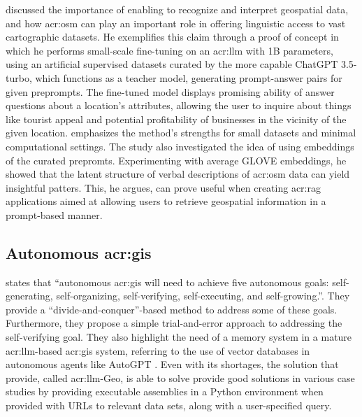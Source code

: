 \cite{unluChatmapLargeLanguage2023} discussed the importance of enabling  to recognize and interpret geospatial data, and how \gls{acr:osm} can play an important role in offering  linguistic access to vast cartographic datasets. He exemplifies this claim through a proof of concept in which he performs small-scale fine-tuning on an \acrshort{acr:llm} with 1B parameters, using an artificial supervised datasets curated by the more capable ChatGPT 3.5-turbo, which functions as a teacher model, generating prompt-answer pairs for given preprompts. The fine-tuned model displays promising ability of answer questions about a location's attributes, allowing the user to inquire about things like tourist appeal and potential profitability of businesses in the vicinity of the given location. \citeauthor{unluChatmapLargeLanguage2023} emphasizes the method's strengths for small datasets and minimal computational settings. The study also investigated the idea of using embeddings of the curated prepromts. Experimenting with average GLOVE embeddings, he showed that the latent structure of verbal descriptions of \gls{acr:osm} data can yield insightful patters. This, he argues, can prove useful when creating \acrfull{acr:rag} applications aimed at allowing users to retrieve geospatial information in a prompt-based manner.

\subsection[Autonomous GIS]{Autonomous \acrshort{acr:gis}}

\cite{liAutonomousGISNextgeneration2023} states that “autonomous \acrshort{acr:gis} will need to achieve five autonomous goals: self-generating, self-organizing, self-verifying, self-executing, and self-growing.”. They provide a “divide-and-conquer”-based method to address some of these goals. Furthermore, they propose a simple trial-and-error approach to addressing the self-verifying goal. They also highlight the need of a memory system in a mature \gls{acr:llm}-based \gls{acr:gis} system, referring to the use of vector databases in autonomous agents like AutoGPT \citep{richardAutoGPTHeartOpensource2023}. Even with its shortages, the solution that \cite{liAutonomousGISNextgeneration2023} provide, called \acrshort{acr:llm}-Geo, is able to solve provide good solutions in various case studies by providing executable assemblies in a Python environment when provided with URLs to relevant data sets, along with a user-specified query.


